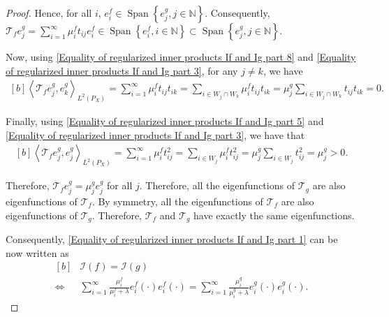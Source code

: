 \documentclass[11pt]{article}
\newcommand{\inprod}[1]{\left \langle #1 \right\rangle}
\newcommand{\LPtwo}{L^{2}(P_{X})}
\theoremstyle{plain}
\begin{document}
\begin{proof}
    Hence, for all $i$, $e_{i}^{f} \in \operatorname{Span}\left\{e_{j}^{g}, j \in \mathbb{N}\right\}$. Consequently, $\mathcal{T}_{f} e_{j}^{g} = \sum_{i=1}^{\infty} \mu_{i}^{f}t_{ij}e_{i}^{f} \in \operatorname{Span}\left\{e_{i}^{f}, i \in \mathbb{N}\right\} \subset \operatorname{Span}\left\{e_{j}^{g}, j \in \mathbb{N}\right\}$. 

    Now, using \eqref{Equality of regularized inner products If and Ig part 8} and \eqref{Equality of regularized inner products If and Ig part 3}, for any $j \neq k$, we have
    \begin{equation*}
        \begin{aligned}[b]
            \inprod{\mathcal{T}_{f} e_{j}^{g},e_{k}^{g}}_{\LPtwo} = \sum_{i=1}^{\infty} \mu_{i}^{f}t_{ij}t_{ik}
            = \sum_{i \in W_{j}\cap W_{k}} \mu_{i}^{f}t_{ij}t_{ik}
            = \mu_{j}^{g} \sum_{i \in W_{j}\cap W_{k}} t_{ij}t_{ik}
            =0.
        \end{aligned}
    \end{equation*}

    Finally, using \eqref{Equality of regularized inner products If and Ig part 5} and \eqref{Equality of regularized inner products If and Ig part 3}, we have that
    \begin{equation*}
        \begin{aligned}[b]
            \inprod{\mathcal{T}_{f} e_{j}^{g},e_{j}^{g}}_{\LPtwo} = \sum_{i=1}^{\infty} \mu_{i}^{f}t_{ij}^{2}
            = \sum_{i \in W_{j}}\mu_{i}^{f}t_{ij}^{2}
            = \mu_{j}^{g}\sum_{i \in W_{j}}t_{ij}^{2}
            =\mu_{j}^{g} > 0.
        \end{aligned}
    \end{equation*}

    Therefore, $\mathcal{T}_{f} e_{j}^{g}=\mu_{j}^{g}  e_{j}^{g}$ for all $j$. Therefore, all the eigenfunctions of $\mathcal{T}_{g}$ are also eigenfunctions of $\mathcal{T}_{f}$. By symmetry, all the eigenfunctions of $\mathcal{T}_{f}$ are also eigenfunctions of $\mathcal{T}_{g}$. Therefore, $\mathcal{T}_{f}$ and $\mathcal{T}_{g}$ have exactly the same eigenfunctions. 

    Consequently, \eqref{Equality of regularized inner products If and Ig part 1} can be now written as
    \begin{equation}\label{Equality of regularized inner products If and Ig part 11}
        \begin{aligned}[b]
            &\mathcal{I}(f) = \mathcal{I}(g)\\
            \iff &\sum_{i=1}^{\infty} \frac{\mu_{i}^{f}}{\mu_{i}^{f} + \lambda} e_{i}^{f}(\cdot) e_{i}^{f}(\cdot) = \sum_{i=1}^{\infty} \frac{\mu_{i}^{g}}{\mu_{i}^{g} + \lambda} e_{i}^{g}(\cdot) e_{i}^{g}(\cdot) .
        \end{aligned}
    \end{equation}


\end{proof}
\end{document}
